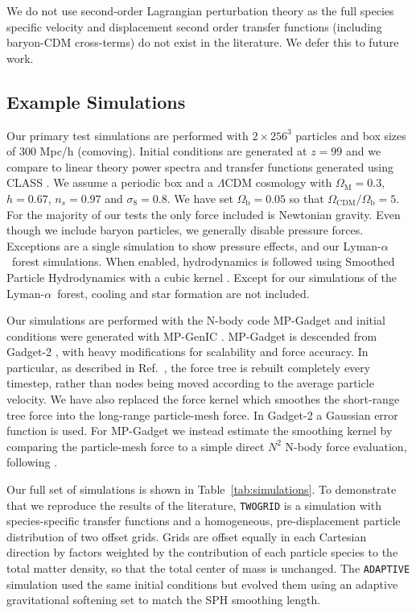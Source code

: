 \documentclass[a4paper,11pt]{article}
\newcommand{\Lya}{Lyman-$\alpha$}
\begin{document}
We do not use second-order Lagrangian perturbation theory \cite{Scoccimarro:1998} as the full species specific velocity and displacement second order transfer functions (including baryon-CDM cross-terms) do not exist in the literature. We defer this to future work.

\subsection{Example Simulations}
\label{sec:simulations}

Our primary test simulations are performed with $2\times 256^3$ particles and box sizes of $300$ Mpc/h (comoving). Initial conditions are generated at $z=99$ and we compare to linear theory power spectra and transfer functions generated using CLASS \cite{CLASS}. We assume a periodic box and a $\Lambda$CDM cosmology with $\Omega_\mathrm{M} = 0.3$, $h = 0.67$, $n_s = 0.97$ and $\sigma_8 = 0.8$. We have set $\Omega_\mathrm{b} = 0.05$ so that $\Omega_{\mathrm{CDM}}/ \Omega_\mathrm{b} = 5$. For the majority of our tests the only force included is Newtonian gravity. Even though we include baryon particles, we generally disable pressure forces. Exceptions are a single simulation to show pressure effects, and our \Lya~forest simulations. When enabled, hydrodynamics is followed using Smoothed Particle Hydrodynamics with a cubic kernel \cite{Springel:2005}. Except for our simulations of the \Lya~forest, cooling and star formation are not included.

Our simulations are performed with the N-body code MP-Gadget and initial conditions were generated with MP-GenIC \cite{yu_feng_2018_1451799}. MP-Gadget is descended from Gadget-2 \cite{Springel:2005}, with heavy modifications for scalability and force accuracy. In particular, as described in Ref.~\cite{Bird:2018}, the force tree is rebuilt completely every timestep, rather than nodes being moved according to the average particle velocity. We have also replaced the force kernel which smoothes the short-range tree force into the long-range particle-mesh force. In Gadget-2 a Gaussian error function is used. For MP-Gadget we instead estimate the smoothing kernel by comparing the particle-mesh force to a simple direct $N^2$ N-body force evaluation, following \cite{Heitmann:2010}.

Our full set of simulations is shown in Table~\ref{tab:simulations}. To demonstrate that we reproduce the results of the literature, \texttt{TWOGRID} is a simulation with species-specific transfer functions and a homogeneous, pre-displacement particle distribution of two offset grids. Grids are offset equally in each Cartesian direction by factors weighted by the contribution of each particle species to the total matter density, so that the total center of mass is unchanged. The \texttt{ADAPTIVE} simulation used the same initial conditions but evolved them using an adaptive gravitational softening set to match the SPH smoothing length.
\end{document}
